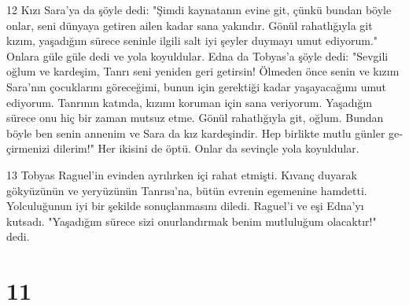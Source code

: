 \par 12 Kızı Sara'ya da şöyle dedi: "Şimdi kaynatanın evine git, çünkü bundan böyle onlar, seni dünyaya getiren ailen kadar sana yakındır. Gönül rahatlığıyla git kızım, yaşadığım süre­ce seninle ilgili salt iyi şeyler duyma­yı umut ediyorum." Onlara güle güle dedi ve yola koyuldular. Edna da Tobyas'a şöyle dedi: "Sevgili oğlum ve kardeşim, Tanrı seni yeniden geri getirsin! Ölmeden önce se­nin ve kızım Sara'nın çocuklarını gö­receğimi, bunun için gerektiği kadar yaşayacağımı umut ediyorum. Tanrı­nın katında, kızımı koruman için sana veriyorum. Yaşadığın sürece onu hiç bir zaman mutsuz etme. Gönül rahat­lığıyla git, oğlum. Bundan böyle ben senin annenim ve Sara da kız kardeşindir. Hep birlikte mutlu günler ge­çirmenizi dilerim!" Her ikisini de öptü. Onlar da sevinçle yola koyuldu­lar.
\par 13 Tobyas Raguel'in evinden ayrı­lırken içi rahat etmişti. Kıvanç duya­rak gökyüzünün ve yeryüzünün Tan­rısı'na, bütün evrenin egemenine hamdetti. Yolculuğunun iyi bir şekilde so­nuçlanmasını diledi. Raguel'i ve eşi Edna'yı kutsadı. "Yaşadığım sürece sizi onurlandırmak benim mutluluğum olacaktır!" dedi.

\chapter{11}


